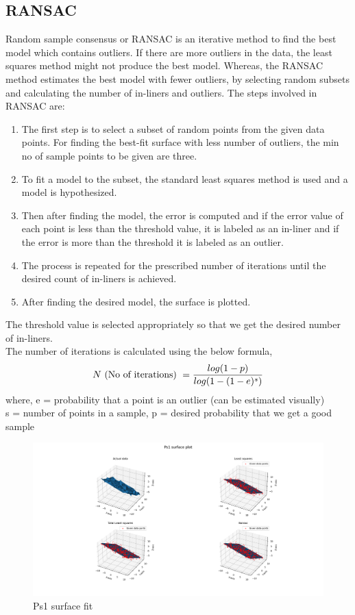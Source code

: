  \subsection{RANSAC}
    Random sample consensus or RANSAC is an iterative method to find the best model which contains outliers. If there are more outliers in the data, the least squares method might not produce the best model. Whereas, the RANSAC method estimates the best model with fewer outliers, by selecting random subsets and calculating the number of in-liners and outliers.
    The steps involved in RANSAC are:
    \begin{enumerate}
        \item The first step is to select a subset of random points from the given data points. For finding the best-fit surface with less number of outliers, the min no of sample points to be given are three.
        \item To fit a model to the subset, the standard least squares method is used and a model is hypothesized.
        \item Then after finding the model, the error is computed and if the error value  of each point is less than the threshold value, it is labeled as an in-liner and if the error is more than the threshold it is labeled as an outlier.
        \item The process is repeated for the prescribed number of iterations until the desired count of in-liners is achieved.
        \item After finding the desired model, the surface is plotted.
    \end{enumerate}
The threshold value is selected appropriately so that we get the desired number of in-liners. \\
The number of iterations is calculated using the below formula, \\
\begin{equation*}
    N \text{ (No of iterations) } = \frac{log(1-p)}{log(1-(1-e)^s)}  \\
\end{equation*}
where, e = probability that a point is an outlier (can be  estimated visually)\\
s = number of points in a sample, p = desired probability that we get a good sample \\


\begin{figure}[!h]
    \includegraphics[width= 1.2\textwidth, trim= 8.5cm 0 0 0]{txt/Proj1_2ps1.png}
    \caption{Ps1 surface fit}
    \label{fig:my_label}
\end{figure}

